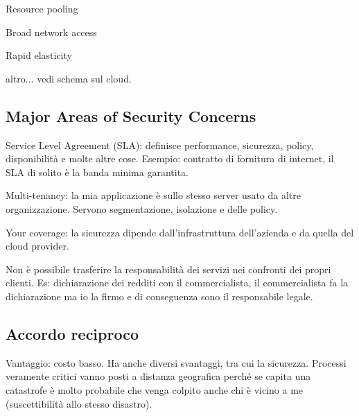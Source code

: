Resource pooling

Broad network access

Rapid elasticity

altro... vedi schema sul cloud.

\subsection{Major Areas of Security Concerns}

Service Level Agreement (SLA): definisce performance, sicurezza, policy, disponibilità e molte altre cose. Esempio: contratto di fornitura di internet, il SLA di solito è la banda minima garantita.

Multi-tenancy: la mia applicazione è sullo stesso server usato da altre organizzazione. Servono segmentazione, isolazione e delle policy.

Your coverage: la sicurezza dipende dall'infrastruttura dell'azienda e da quella del cloud provider.

Non è possibile trasferire la responsabilità dei servizi nei confronti dei propri clienti. Es: dichiarazione dei redditi con il commercialista, il commercialista fa la dichiarazione ma io la firmo e di conseguenza sono il responsabile legale.

\subsection{Accordo reciproco}

Vantaggio: costo basso. Ha anche diversi svantaggi, tra cui la sicurezza.
Processi veramente critici vanno posti a distanza geografica perché se capita una catastrofe è molto probabile che venga colpito anche chi è vicino a me (suscettibilità allo stesso disastro).